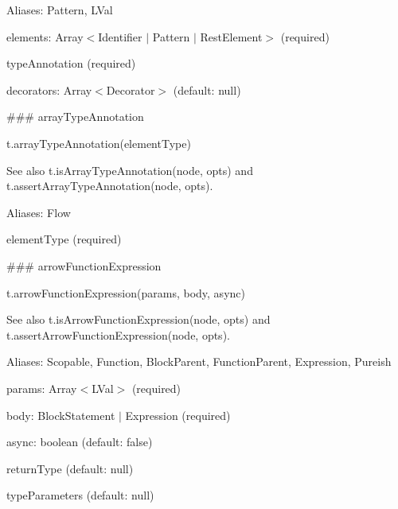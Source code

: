 Aliases\+: {\ttfamily Pattern}, {\ttfamily L\+Val}


\begin{DoxyItemize}
\item {\ttfamily elements}\+: {\ttfamily Array$<$Identifier $\vert$ Pattern $\vert$ Rest\+Element$>$} (required)
\item {\ttfamily type\+Annotation} (required)
\item {\ttfamily decorators}\+: {\ttfamily Array$<$Decorator$>$} (default\+: {\ttfamily null}) 


\end{DoxyItemize}

\#\#\# array\+Type\+Annotation 
\begin{DoxyCode}
t.arrayTypeAnnotation(elementType)
\end{DoxyCode}


See also {\ttfamily t.\+is\+Array\+Type\+Annotation(node, opts)} and {\ttfamily t.\+assert\+Array\+Type\+Annotation(node, opts)}.

Aliases\+: {\ttfamily Flow}


\begin{DoxyItemize}
\item {\ttfamily element\+Type} (required) 


\end{DoxyItemize}

\#\#\# arrow\+Function\+Expression 
\begin{DoxyCode}
t.arrowFunctionExpression(params, body, async)
\end{DoxyCode}


See also {\ttfamily t.\+is\+Arrow\+Function\+Expression(node, opts)} and {\ttfamily t.\+assert\+Arrow\+Function\+Expression(node, opts)}.

Aliases\+: {\ttfamily Scopable}, {\ttfamily Function}, {\ttfamily Block\+Parent}, {\ttfamily Function\+Parent}, {\ttfamily Expression}, {\ttfamily Pureish}


\begin{DoxyItemize}
\item {\ttfamily params}\+: {\ttfamily Array$<$L\+Val$>$} (required)
\item {\ttfamily body}\+: {\ttfamily Block\+Statement $\vert$ Expression} (required)
\item {\ttfamily async}\+: {\ttfamily boolean} (default\+: {\ttfamily false})
\item {\ttfamily return\+Type} (default\+: {\ttfamily null})
\item {\ttfamily type\+Parameters} (default\+: {\ttfamily null}) 


\end{DoxyItemize}

